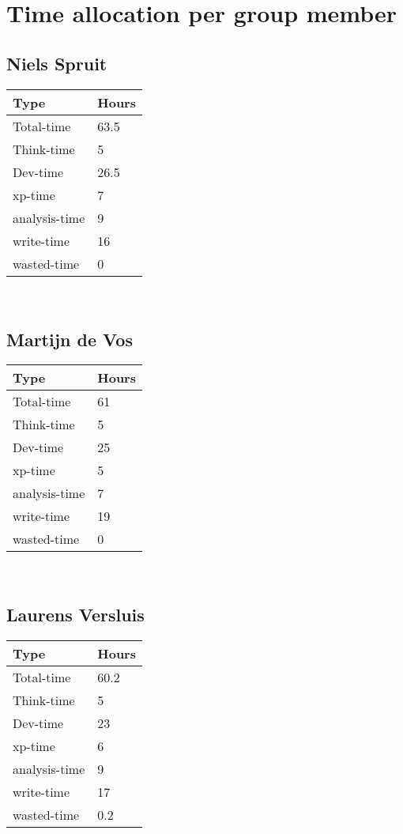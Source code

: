\section{Time allocation per group member}
\label{apx:time-allocation}

	\subsection{Niels Spruit}
	
	\begin{tabular}{|l|l|}
		\hline 
		Type			& Hours	\\ \hline
		Total-time 		& 63.5	\\ \hline
		Think-time 		& 5		\\ \hline
		Dev-time   		& 26.5	\\ \hline
		xp-time    		& 7		\\ \hline
		analysis-time 	& 9		\\ \hline
		write-time		& 16	\\ \hline
		wasted-time 	& 0	\\ \hline
		
	\end{tabular} \\
	
	\subsection{Martijn de Vos}
		
	\begin{tabular}{|l|l|}
		\hline 
		Type			& Hours	\\ \hline
		Total-time 		& 61	\\ \hline
		Think-time 		& 5		\\ \hline
		Dev-time   		& 25	\\ \hline
		xp-time    		& 5		\\ \hline
		analysis-time 	& 7		\\ \hline
		write-time		& 19	\\ \hline
		wasted-time 	& 0	\\ \hline
		
	\end{tabular}\\
	
	\subsection{Laurens Versluis}
			
	\begin{tabular}{|l|l|}
		\hline 
		Type			& Hours	\\ \hline
		Total-time 		& 60.2	\\ \hline
		Think-time 		& 5		\\ \hline
		Dev-time   		& 23	\\ \hline
		xp-time    		& 6		\\ \hline
		analysis-time 	& 9		\\ \hline
		write-time		& 17	\\ \hline
		wasted-time 	& 0.2	\\ \hline
		
	\end{tabular}